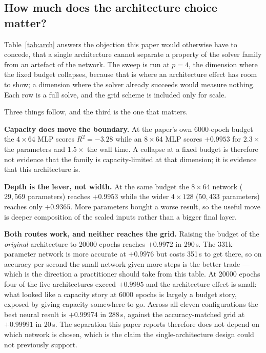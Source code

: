 \documentclass[conference]{IEEEtran}
\begin{document}
\subsection{How much does the architecture choice matter?}\label{sec:arch}

Table~\ref{tab:arch} answers the objection this paper would otherwise have to concede, that a single
architecture cannot separate a property of the solver family from an artefact of the network. The
sweep is run at $p=4$, the dimension where the fixed budget collapses, because that is where an
architecture effect has room to show; a dimension where the solver already succeeds would measure
nothing. Each row is a full solve, and the grid scheme is included only for scale.



Three things follow, and the third is the one that matters.

\textbf{Capacity does move the boundary.} At the paper's own 6000-epoch budget the $4\times64$ MLP
scores $R^2 = -3.28$ while an $8\times64$ MLP scores $+0.9953$ for $2.3\times$ the parameters and
$1.5\times$ the wall time. A collapse at a fixed budget is therefore not evidence that the family is
capacity-limited at that dimension; it is evidence that this architecture is.

\textbf{Depth is the lever, not width.} At the same budget the $8\times64$ network
($29{,}569$ parameters) reaches $+0.9953$ while the wider $4\times128$ ($50{,}433$ parameters)
reaches only $+0.9365$. More parameters bought a worse result, so the useful move is deeper
composition of the scaled inputs rather than a bigger final layer.

\textbf{Both routes work, and neither reaches the grid.} Raising the budget of the \emph{original}
architecture to 20000 epochs reaches $+0.9972$ in 290\,s. The 331k-parameter network is more accurate
at $+0.9976$ but costs 351\,s to get there, so on accuracy per second the small network given more
steps is the better trade --- which is the direction a practitioner should take from this table.
At 20000 epochs four of the five architectures exceed $+0.9995$ and the architecture effect is small:
what looked like a capacity story at 6000 epochs is largely a budget story, exposed by giving
capacity somewhere to go. Across all eleven configurations the best neural result is $+0.99974$ in
288\,s, against the accuracy-matched grid at $+0.99991$ in 20\,s. The separation this paper reports
therefore does not depend on which network is chosen, which is the claim the single-architecture
design could not previously support.
\end{document}
